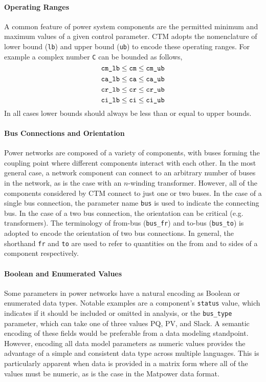 \documentclass{article}
\newcommand{\matpower}[0]{{\sc Matpower}}
\begin{document}
\paragraph{Operating Ranges}
%
A common feature of power system components are the permitted minimum and maximum values of a given control parameter.  CTM adopts the nomenclature of lower bound (\texttt{lb}) and upper bound (\texttt{ub}) to encode these operating ranges.  For example a complex number \texttt{C} can be bounded as follows, 
$$
\texttt{cm\_lb} \leq \texttt{cm} \leq \texttt{cm\_ub}\\
$$
$$
\texttt{ca\_lb} \leq \texttt{ca} \leq \texttt{ca\_ub}\\
$$
$$
\texttt{cr\_lb} \leq \texttt{cr} \leq \texttt{cr\_ub}\\
$$
$$
\texttt{ci\_lb} \leq \texttt{ci} \leq \texttt{ci\_ub}\\
$$
In all cases lower bounds should always be less than or equal to upper bounds.


\paragraph{Bus Connections and Orientation}
%
Power networks are composed of a variety of components, with buses forming the coupling point where different components interact with each other.  In the most general case, a network component can connect to an arbitrary number of buses in the network, as is the case with an $n$-winding transformer.  However, all of the components considered by CTM connect to just one or two buses.  In the case of a single bus connection, the parameter name \texttt{bus} is used to indicate the connecting bus.  In the case of a two bus connection, the orientation can be critical (e.g. transformers).  The terminology of from-bus (\texttt{bus\_fr}) and to-bus (\texttt{bus\_to}) is adopted to encode the orientation of two bus connections.   In general, the shorthand \texttt{fr} and \texttt{to} are used to refer to quantities on the from and to sides of a component respectively.


\paragraph{Boolean and Enumerated Values}
%
Some parameters in power networks have a natural encoding as Boolean or enumerated data types.  Notable examples are a component's \texttt{status} value, which indicates if it should be included or omitted in analysis, or the \texttt{bus\_type} parameter, which can take one of three values PQ, PV, and Slack.  A semantic encoding of these fields would be preferable from a data modeling standpoint.  However, encoding all data model parameters as numeric values provides the advantage of a simple and consistent data type across multiple languages.  This is particularly apparent when data is provided in a matrix form where all of the values must be numeric, as is the case in the \matpower{} \cite{Zimmerman2011} data format.
\end{document}
